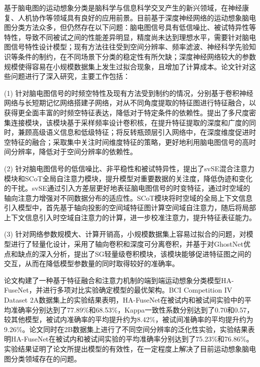 
基于脑电图的运动想象分类是脑科学与信息科学交叉产生的新兴领域，在神经康复、人机协作等领域具有良好的应用前景。目前基于深度神经网络的运动想象脑电图分类方法众多，但仍然存在以下问题：脑电图信号具有低信噪比、被试特异性等特性，导致不同被试之间的性能差异明显，精度尚未达到理想水平，需要针对脑电图信号特性设计模型；现有方法往往受到空间分辨率、频率滤波、神经科学先验知识等条件的制约，在不同场景下分类的稳定性有所欠缺；深度神经网络较大的参数规模使得容易在小规模数据集上发生过拟合现象，且增加了计算成本。论文针对这些问题进行了深入研究，主要工作包括：

(1) 针对脑电图信号的时频空特性及现有方法受到制约的情况，分别基于卷积神经网络与长短期记忆网络搭建子网络，对从不同角度提取的特征图进行特征融合，以获得更全面丰富的时频空特征表达，降低对于特定条件的依赖性。提出了多尺度密集连接模块，该模块基于采样频率设计卷积核，在提升特征提取的深度和广度的同时，兼顾高级语义信息和低级特征；将反转瓶颈层引入网络中，在深度维度促进时空特征的融合；采取集中关注时间维度特征的策略，更好地利用脑电图信号的高时间分辨率，降低对于空间分辨率的依赖性。

(2) 针对脑电图信号的低信噪比、非平稳性和被试特异性，提出了svSE混合注意力模块和SCoT全局自注意力模块，提升模型对重要数据的关注度，降低伪迹和变化的干扰。svSE通过引入方差层更好地表征脑电图信号的时变特征，通过时空域的轴向注意力增强对不同数据分布的适应性。SCoT模块将时空域的全局上下文信息引入模型中，首先基于轴向投影的空间域特征图计算空间域自注意力，随后将局部上下文信息引入时空域自注意力的计算，进一步校准注意力，提升特征表征能力。

(3) 针对网络参数规模大、计算开销高，小规模数据集上容易过拟合的问题，对模型进行了轻量化设计，采用了轴向卷积和深度可分离卷积，并基于对GhostNet优点和缺点的深入分析，提出了SG轻量级卷积模块，该模块能够促进特征图之间的交互，从而在降低模型参数量的同时取得较好的准确率。

论文构建了一种基于特征融合和注意力机制的端到端运动想象分类模型HA-FuseNet，并进行多项对比实验确定模型的最优架构。BCI Competition IV Dataset 2A数据集上的实验结果表明，HA-FuseNet在被试内和被试间实验中的平均准确率分别达到了77.89\%和68.53\%，Kappa一致性系数分别达到了0.70和0.57，较其他模型，被试内准确率的平均提升约为8.42\%，被试间准确率的平均提升约为9.26\%。论文同时在2B数据集上进行了不同空间分辨率的泛化性实验，实验结果表明HA-FuseNet在被试内和被试间实验的平均准确率分别达到了75.23\%和76.86\%。实验结果证明了论文所提出模型的有效性，在一定程度上解决了目前运动想象脑电图分类领域存在的问题。